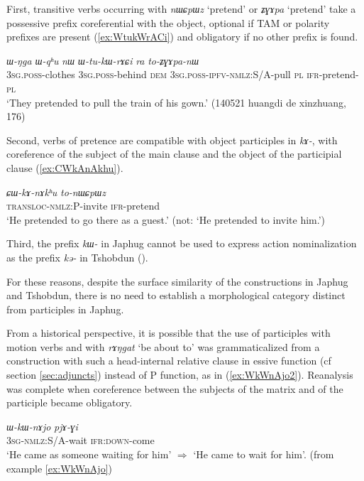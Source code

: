 \documentclass[oneside,a4paper,11pt]{article}
\newcommand{\ipa}[1]{\textit{\phon#1}}
\newcommand{\jpg}[2]{\ipa{#1} `#2'}
\begin{document}
First, transitive verbs occurring with \jpg{nɯɕpɯz}{pretend} or \jpg{ʑɣɤpa}{pretend} take a possessive prefix coreferential with the object, optional if TAM or polarity prefixes are present (\ref{ex:WtukWrACi}) and obligatory if no other prefix is found.

\begin{exe}
\ex \label{ex:WtukWrACi}
\gll \ipa{ɯ-ŋga} 	\ipa{ɯ-qʰu} 	\ipa{nɯ} 	\ipa{ɯ-tu-kɯ-rɤɕi} 	\ipa{ra} 	\ipa{to-ʑɣɤpa-nɯ}  \\
\textsc{3sg.poss}-clothes \textsc{3sg.poss}-behind \textsc{dem} \textsc{3sg.poss-ipfv-nmlz}:S/A-pull \textsc{pl} \textsc{ifr}-pretend-\textsc{pl} \\
\glt `They pretended to pull the train of his gown.' (140521 huangdi de xinzhuang, 176)
\end{exe}

Second, verbs of pretence are compatible with object participles in \ipa{kɤ-}, with coreference of the subject of the main clause and the object of the participial clause (\ref{ex:CWkAnAkhu}).

\begin{exe}
\ex \label{ex:CWkAnAkhu}
\gll   	\ipa{ɕɯ-kɤ-nɤkʰu} 	 \ipa{to-nɯɕpɯz}  \\
 \textsc{transloc-nmlz:P}-invite \textsc{ifr}-pretend  \\
\glt `He pretended to go there as a guest.' (not: `He pretended to invite him.')
\end{exe}

Third, the prefix \ipa{kɯ-} in Japhug cannot be used to express action nominalization as the prefix \ipa{kə-} in Tshobdun (\citealt[482]{sun12complementation}). 

For these reasons, despite the surface similarity of the constructions in Japhug and Tshobdun, there is no need to establish a morphological category distinct from participles in Japhug.

From a historical perspective, it is possible that the use of participles with motion verbs and with \jpg{rɤŋgat}{be about to} was grammaticalized from a construction with such a head-internal relative clause in essive function (cf section \ref{sec:adjuncts}) instead of P function, as in (\ref{ex:WkWnAjo2}). Reanalysis was complete when coreference between the subjects of the matrix and of the participle became obligatory.

\begin{exe}
\ex \label{ex:WkWnAjo2}
\gll 	\ipa{ɯ-kɯ-nɤjo} 	\ipa{pjɤ-ɣi} \\
 \textsc{3sg-nmlz:S/A}-wait \textsc{ifr:down}-come \\
\glt *`He came as someone waiting for him' $\Rightarrow$ `He came to wait for him'. (from example \ref{ex:WkWnAjo})
\end{exe}
\end{document}
